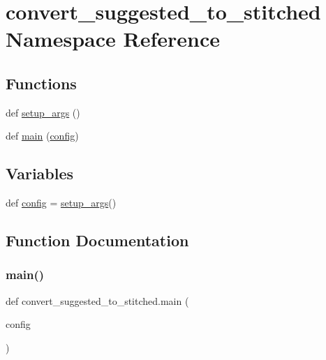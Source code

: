 \hypertarget{namespaceconvert__suggested__to__stitched}{}\section{convert\+\_\+suggested\+\_\+to\+\_\+stitched Namespace Reference}
\label{namespaceconvert__suggested__to__stitched}
\subsection*{Functions}
\begin{DoxyCompactItemize}
\item 
def \hyperlink{namespaceconvert__suggested__to__stitched_a6d40b7687a1f943f799a2b537ebecce4}{setup\+\_\+args} ()
\item 
def \hyperlink{namespaceconvert__suggested__to__stitched_ac3bf979d2e88b310cde10ac1eac0406a}{main} (\hyperlink{namespaceconvert__suggested__to__stitched_af8347b96cb6291fa574eedbd718e7726}{config})
\end{DoxyCompactItemize}
\subsection*{Variables}
\begin{DoxyCompactItemize}
\item 
def \hyperlink{namespaceconvert__suggested__to__stitched_af8347b96cb6291fa574eedbd718e7726}{config} = \hyperlink{namespaceconvert__suggested__to__stitched_a6d40b7687a1f943f799a2b537ebecce4}{setup\+\_\+args}()
\end{DoxyCompactItemize}


\subsection{Function Documentation}
\mbox{\label{namespaceconvert__suggested__to__stitched_ac3bf979d2e88b310cde10ac1eac0406a}} 
\subsubsection{\texorpdfstring{main()}{main()}}
{\footnotesize\ttfamily def convert\+\_\+suggested\+\_\+to\+\_\+stitched.\+main (\begin{DoxyParamCaption}\item[{}]{config }\end{DoxyParamCaption})}

